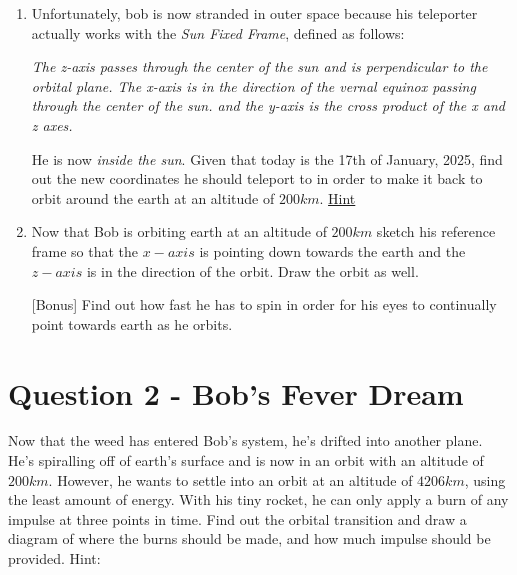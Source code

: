 \documentclass[a4paper, 12pt]{exam}
\begin{document}
\begin{enumerate}[label=(\alph*)]
		\pagebreak
		
		\item Unfortunately, bob is now stranded in outer space because his teleporter actually works with the \textit{Sun Fixed Frame}, defined as follows:
		\begin{center}
			\textit{The z-axis passes through the center of the sun and is perpendicular to the orbital plane. The x-axis is in the direction of the vernal equinox passing through the center of the sun. and the y-axis is the cross product of the x and z axes.}
		\end{center}
		He is now \textit{inside the sun}. Given that today is the 17th of January, 2025, find out the new coordinates he should teleport to in order to make it back to orbit around the earth at an altitude of $200km$. \href{https://ssd.jpl.nasa.gov/horizons/app.html#/}{Hint}
		
		\item Now that Bob is orbiting earth at an altitude of $200km$ sketch his reference frame so that the $x-axis$ is pointing down towards the earth and the $z-axis$ is in the direction of the orbit. Draw the orbit as well. 
		
		[Bonus] Find out how fast he has to spin in order for his eyes to continually point towards earth as he orbits.
	\end{enumerate}
	
	\pagebreak
	
	\section*{Question 2 - Bob's Fever Dream}
	Now that the weed has entered Bob's system, he's drifted into another plane. He's spiralling off of earth's surface and is now in an orbit with an altitude of $200km$. However, he wants to settle into an orbit at an altitude of $4206km$, using the least amount of energy. With his tiny rocket, he can only apply a burn of any impulse at three points in time. Find out the orbital transition and draw a diagram of where the burns should be made, and how much impulse should be provided. Hint:
	
\end{document}
